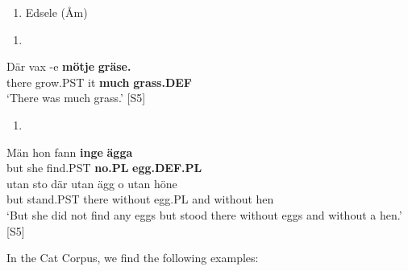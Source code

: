 \begin{enumerate} %
\item 
Edsele (Åm)

\end{enumerate} %
\setcounter{listLFOxcviiileveli}{0}
\begin{enumerate} %
\item 
\end{enumerate} %
\ea\label{}
\gll Där  vax  {}-e  \textbf{mötje}\textbf{  gräse.}\\


there  grow.PST  it  \textbf{much} \textbf{grass.DEF}\\ %


‘There was much grass.’ [S5]
\z

\begin{enumerate} %
\item 
\end{enumerate} %
\ea\label{}
\gll Män  hon  fann  \textbf{inge} \textbf{ägga}\\


but  she  find.PST  \textbf{no.PL} \textbf{egg.DEF.PL}\\ %


\ea\label{}
\gll utan  sto  där  utan  ägg  o  utan  höne\\


but  stand.PST  there  without  egg.PL  and  without  hen\\ %


‘But she did not find any eggs but stood there without eggs and without a hen.’ [S5]
\z

In the Cat Corpus, we find the following examples:

